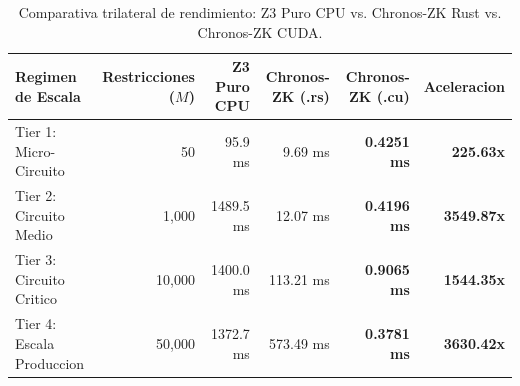 \begin{table}[htbp]
\centering
\small
\caption{Comparativa trilateral de rendimiento: Z3 Puro CPU vs. Chronos-ZK Rust vs. Chronos-ZK CUDA.}
\label{tab:chronos_zk_benchmarks}
\begin{tabular*}{\textwidth}{@{\extracolsep{\fill}}lrrrrr@{}}
\toprule
\textbf{Regimen de Escala} & \textbf{Restricciones ($M$)} & \textbf{Z3 Puro CPU} & \textbf{Chronos-ZK (.rs)} & \textbf{Chronos-ZK (.cu)} & \textbf{Aceleracion} \\
\midrule
Tier 1: Micro-Circuito & 50 & 95.9 ms & 9.69 ms & \textbf{0.4251 ms} & \textbf{225.63x} \\
Tier 2: Circuito Medio & 1,000 & 1489.5 ms & 12.07 ms & \textbf{0.4196 ms} & \textbf{3549.87x} \\
Tier 3: Circuito Critico & 10,000 & 1400.0 ms & 113.21 ms & \textbf{0.9065 ms} & \textbf{1544.35x} \\
Tier 4: Escala Produccion & 50,000 & 1372.7 ms & 573.49 ms & \textbf{0.3781 ms} & \textbf{3630.42x} \\
\bottomrule
\end{tabular*}
\end{table}
